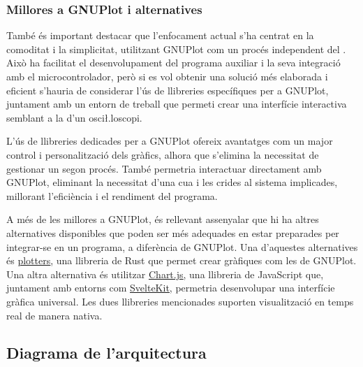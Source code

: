 \documentclass{tfgitic}[2023/07/07]
\begin{document}
\subsubsection{Millores a GNUPlot i alternatives}

També és important destacar que l'enfocament actual s'ha centrat en la
comoditat i la simplicitat, utilitzant GNUPlot com un procés
independent del . Això ha facilitat el desenvolupament
del programa auxiliar i la seva integració amb el microcontrolador,
però si es vol obtenir una solució més elaborada i eficient s'hauria
de considerar l'ús de llibreries específiques per a GNUPlot, juntament
amb un entorn de treball que permeti crear una interfície interactiva
semblant a la d'un osci\l.loscopi.

L'ús de llibreries dedicades per a GNUPlot ofereix avantatges com un
major control i personalització dels gràfics, alhora que s'elimina la
necessitat de gestionar un segon procés. També permetria interactuar
directament amb GNUPlot, eliminant la necessitat d'una cua i les
crides al sistema implicades, millorant l'eficiència i el rendiment
del programa.

A més de les millores a GNUPlot, és rellevant assenyalar que hi ha
altres alternatives disponibles que poden ser més adequades en estar
preparades per integrar-se en un programa, a diferència de
GNUPlot. Una d'aquestes alternatives és
\href{https://docs.rs/plotters/latest/plotters}{\underline{plotters}},
una llibreria de Rust que permet crear gràfiques com les de
GNUPlot. Una altra alternativa és utilitzar
\href{https://www.chartjs.org/}{\underline{Chart.js}}, una llibreria
de JavaScript que, juntament amb entorns com
\href{https://kit.svelte.dev/}{\underline{SvelteKit}}, permetria
desenvolupar una interfície gràfica universal. Les dues llibreries
mencionades suporten visualització en temps real de manera nativa.

\subsection{Diagrama de l'arquitectura}
\end{document}
